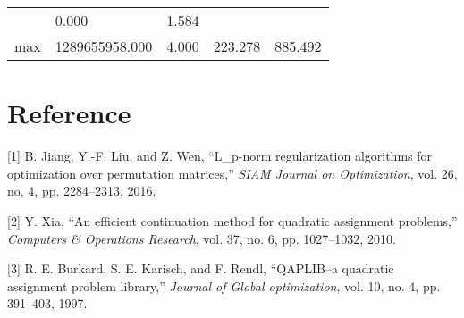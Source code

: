 \documentclass[
  10pt,
  a4paper,
,tablecaptionabove
]{scrartcl}
\newenvironment{cslreferences}%
  {}%
  {\par}
\begin{document}
\begin{longtable}[]{@{}lllll@{}}
\begin{minipage}[t]{0.13\columnwidth}
\end{minipage} & \begin{minipage}[t]{0.15\columnwidth}\raggedright
0.000\strut
\end{minipage} & \begin{minipage}[t]{0.15\columnwidth}\raggedright
1.584\strut
\end{minipage}\tabularnewline
\begin{minipage}[t]{0.11\columnwidth}\raggedright
max\strut
\end{minipage} & \begin{minipage}[t]{0.20\columnwidth}\raggedright
1289655958.000\strut
\end{minipage} & \begin{minipage}[t]{0.13\columnwidth}\raggedright
4.000\strut
\end{minipage} & \begin{minipage}[t]{0.15\columnwidth}\raggedright
223.278\strut
\end{minipage} & \begin{minipage}[t]{0.15\columnwidth}\raggedright
885.492\strut
\end{minipage}\tabularnewline
\bottomrule
\end{longtable}

\hypertarget{reference}{%
\section*{Reference}\label{reference}}

\hypertarget{refs}{}
\begin{cslreferences}
\leavevmode\hypertarget{ref-jiang_l_p-norm_2016}{}%
{[}1{]} B. Jiang, Y.-F. Liu, and Z. Wen, ``L\_p-norm regularization
algorithms for optimization over permutation matrices,'' \emph{SIAM
Journal on Optimization}, vol. 26, no. 4, pp. 2284--2313, 2016.

\leavevmode\hypertarget{ref-xia_efficient_2010}{}%
{[}2{]} Y. Xia, ``An efficient continuation method for quadratic
assignment problems,'' \emph{Computers \& Operations Research}, vol. 37,
no. 6, pp. 1027--1032, 2010.

\leavevmode\hypertarget{ref-burkard1997qaplib}{}%
{[}3{]} R. E. Burkard, S. E. Karisch, and F. Rendl, ``QAPLIB--a
quadratic assignment problem library,'' \emph{Journal of Global
optimization}, vol. 10, no. 4, pp. 391--403, 1997.
\end{cslreferences}
\end{document}

